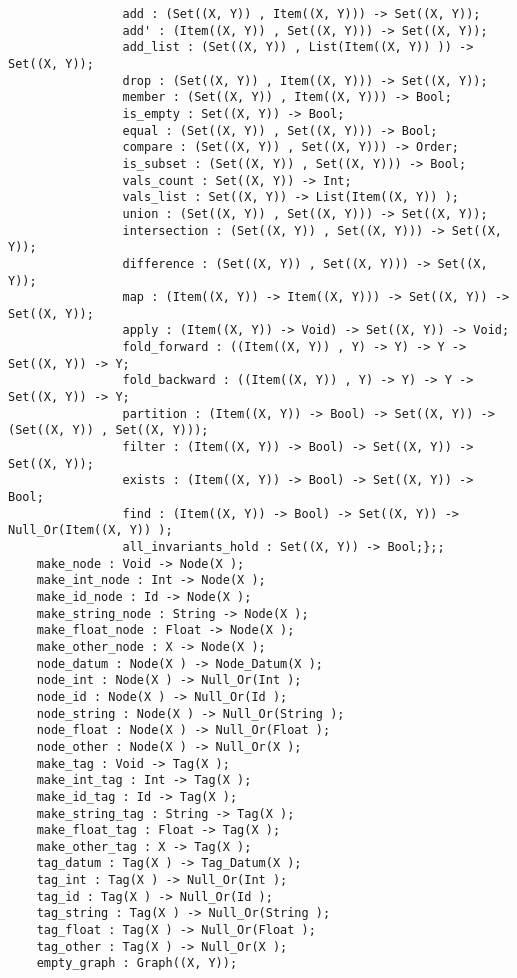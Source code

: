 \begin{verbatim}
                add : (Set((X, Y)) , Item((X, Y))) -> Set((X, Y));
                add' : (Item((X, Y)) , Set((X, Y))) -> Set((X, Y));
                add_list : (Set((X, Y)) , List(Item((X, Y)) )) -> Set((X, Y));
                drop : (Set((X, Y)) , Item((X, Y))) -> Set((X, Y));
                member : (Set((X, Y)) , Item((X, Y))) -> Bool;
                is_empty : Set((X, Y)) -> Bool;
                equal : (Set((X, Y)) , Set((X, Y))) -> Bool;
                compare : (Set((X, Y)) , Set((X, Y))) -> Order;
                is_subset : (Set((X, Y)) , Set((X, Y))) -> Bool;
                vals_count : Set((X, Y)) -> Int;
                vals_list : Set((X, Y)) -> List(Item((X, Y)) );
                union : (Set((X, Y)) , Set((X, Y))) -> Set((X, Y));
                intersection : (Set((X, Y)) , Set((X, Y))) -> Set((X, Y));
                difference : (Set((X, Y)) , Set((X, Y))) -> Set((X, Y));
                map : (Item((X, Y)) -> Item((X, Y))) -> Set((X, Y)) -> Set((X, Y));
                apply : (Item((X, Y)) -> Void) -> Set((X, Y)) -> Void;
                fold_forward : ((Item((X, Y)) , Y) -> Y) -> Y -> Set((X, Y)) -> Y;
                fold_backward : ((Item((X, Y)) , Y) -> Y) -> Y -> Set((X, Y)) -> Y;
                partition : (Item((X, Y)) -> Bool) -> Set((X, Y)) -> (Set((X, Y)) , Set((X, Y)));
                filter : (Item((X, Y)) -> Bool) -> Set((X, Y)) -> Set((X, Y));
                exists : (Item((X, Y)) -> Bool) -> Set((X, Y)) -> Bool;
                find : (Item((X, Y)) -> Bool) -> Set((X, Y)) -> Null_Or(Item((X, Y)) );
                all_invariants_hold : Set((X, Y)) -> Bool;};;
    make_node : Void -> Node(X );
    make_int_node : Int -> Node(X );
    make_id_node : Id -> Node(X );
    make_string_node : String -> Node(X );
    make_float_node : Float -> Node(X );
    make_other_node : X -> Node(X );
    node_datum : Node(X ) -> Node_Datum(X );
    node_int : Node(X ) -> Null_Or(Int );
    node_id : Node(X ) -> Null_Or(Id );
    node_string : Node(X ) -> Null_Or(String );
    node_float : Node(X ) -> Null_Or(Float );
    node_other : Node(X ) -> Null_Or(X );
    make_tag : Void -> Tag(X );
    make_int_tag : Int -> Tag(X );
    make_id_tag : Id -> Tag(X );
    make_string_tag : String -> Tag(X );
    make_float_tag : Float -> Tag(X );
    make_other_tag : X -> Tag(X );
    tag_datum : Tag(X ) -> Tag_Datum(X );
    tag_int : Tag(X ) -> Null_Or(Int );
    tag_id : Tag(X ) -> Null_Or(Id );
    tag_string : Tag(X ) -> Null_Or(String );
    tag_float : Tag(X ) -> Null_Or(Float );
    tag_other : Tag(X ) -> Null_Or(X );
    empty_graph : Graph((X, Y));

\end{verbatim}
